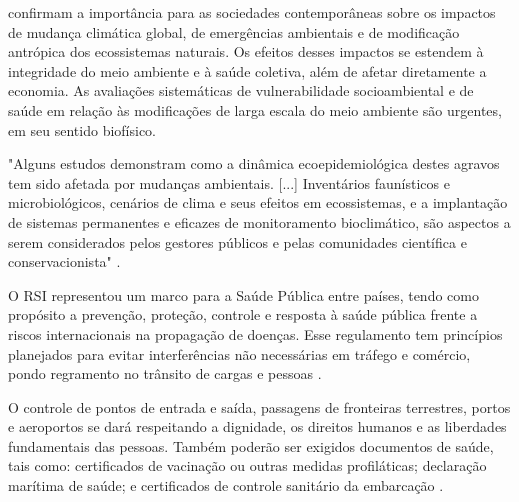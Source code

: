 \indent {} confirmam a importância para as sociedades contemporâneas sobre os impactos de mudança climática global, de emergências ambientais e de modificação antrópica dos ecossistemas naturais. Os efeitos desses impactos se estendem à integridade do meio ambiente e à saúde coletiva, além de afetar diretamente a economia. As avaliações sistemáticas de vulnerabilidade socioambiental e de saúde em relação às modificações de larga escala do meio ambiente são urgentes, em seu sentido biofísico. 

\begin{citacao}
"Alguns estudos demonstram como a dinâmica ecoepidemiológica destes agravos tem sido afetada por mudanças ambientais. [...] Inventários faunísticos e microbiológicos, cenários de clima e seus efeitos em ecossistemas, e a implantação de sistemas permanentes e eficazes de monitoramento bioclimático, são aspectos a serem considerados pelos gestores públicos e pelas comunidades científica e conservacionista" \cite[pg-2325]{Cubas2014Tratado}.
\end{citacao}


\indent O \acrfull{RSI} representou um marco para a Saúde Pública entre países, tendo como propósito a prevenção, proteção, controle e resposta à saúde pública frente a riscos internacionais na propagação de doenças. Esse regulamento tem princípios planejados para evitar interferências não necessárias em tráfego e comércio, pondo regramento no trânsito de cargas e pessoas \cite{Brasil2005RegulamentoSI}.

\indent O controle de pontos de entrada e saída, passagens de fronteiras terrestres, portos e aeroportos se dará respeitando a dignidade, os direitos humanos e as liberdades fundamentais das pessoas. Também poderão ser exigidos documentos de saúde, tais como: certificados de vacinação ou outras medidas profiláticas; declaração marítima de saúde; e certificados de controle sanitário da embarcação \cite{Brasil2005RegulamentoSI}.

